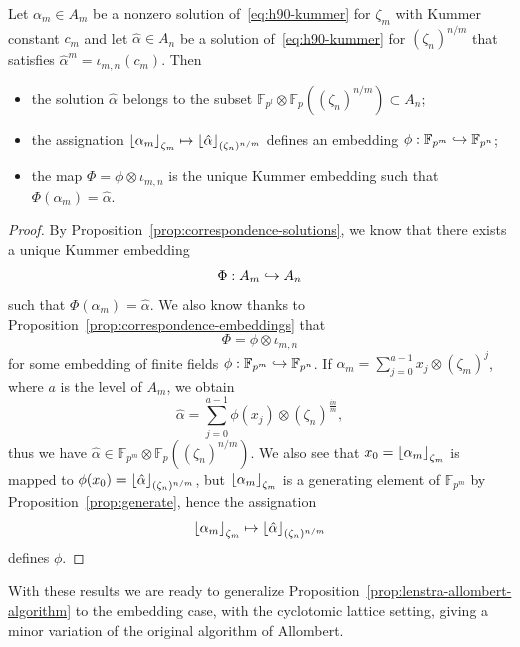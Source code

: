 \begin{cor}
  \label{cor:link-h90-embedding}
  Let $\alpha_m\in A_m$ be a nonzero solution of~\eqref{eq:h90-kummer} for
  $\zeta_m$ with Kummer constant $c_m$ and let $\hat\alpha\in A_n$ be a solution
  of~\eqref{eq:h90-kummer} for $(\zeta_n)^{n/m}$ that satisfies
  $\hat{\alpha}^m=\iota_{m, n}(c_m)$. Then
  \begin{itemize}
    \item the solution $\hat{\alpha}$ belongs to the subset
      $\mathbb{F}_{p^{l}}\otimes\mathbb{F}_p((\zeta_n)^{n/m})\subset A_n$;
    \item the assignation
      $\left\lfloor \alpha_m \right\rfloor_{\zeta_m}\mapsto\left\lfloor \hat\alpha \right\rfloor_{(\zeta_n)^{n/m}}$
      defines an embedding $\phi:\mathbb{F}_{p^{m}}\hookrightarrow\mathbb{F}_{p^{n}}$;
    \item the map $\Phi=\phi\otimes\iota_{m, n}$ is the unique Kummer embedding
      such that $\Phi(\alpha_m)=\hat\alpha$.
  \end{itemize}
\end{cor}
\begin{proof}
  By Proposition~\ref{prop:correspondence-solutions}, we know that there exists
  a unique Kummer embedding 
  \[
    \Phi:A_m\hookrightarrow A_n
  \]
  such that $\Phi(\alpha_m) =
  \hat\alpha$. We also know thanks to
  Proposition~\ref{prop:correspondence-embeddings} that
  \[
    \Phi=\phi\otimes\iota_{m, n}
  \]
  for some embedding of finite fields
  $\phi:\mathbb{F}_{p^{m}}\hookrightarrow\mathbb{F}_{p^{n}}$. If $\alpha_m =
  \sum_{j=0}^{a-1}x_j\otimes(\zeta_m)^j$, where $a$ is the level of $A_m$, we
  obtain
  \[
    \hat\alpha = \sum_{j=0}^{a-1}\phi(x_j)\otimes(\zeta_n)^{\frac{in}{m}},
  \]
  thus we have $\hat\alpha\in\mathbb{F}_{p^{m}}\otimes\mathbb{F}_{p}(
  (\zeta_n)^{n/m})$. We also see that $x_0=\left\lfloor \alpha_m \right\rfloor_{\zeta_m}$ is mapped
  to $\phi(x_0) = \left\lfloor \hat\alpha \right\rfloor_{(\zeta_n)^{n/m}}$, but
  $\left\lfloor \alpha_m \right\rfloor_{\zeta_m}$ is a generating element of
  $\mathbb{F}_{p^{m}}$ by Proposition~\ref{prop:generate}, hence the assignation
  \[
    \left\lfloor \alpha_m \right\rfloor_{\zeta_m}\mapsto\left\lfloor \hat\alpha \right\rfloor_{(\zeta_n)^{n/m}}
  \]
  defines $\phi$.
\end{proof}
With these results we are ready to generalize
Proposition~\ref{prop:lenstra-allombert-algorithm} to the embedding case, with
the cyclotomic lattice setting, giving a minor variation of the original
algorithm of Allombert.
